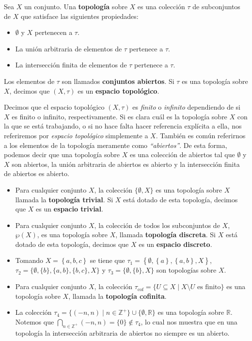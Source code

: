 \begin{Def}
   Sea $X$ un conjunto. Una \textbf{topología} sobre $X$ es una colección $\tau$ de subconjuntos de $X$ que satisface las siguientes propiedades:
   \begin{itemize}
      \item[1.] $\emptyset$ y $X$ pertenecen a $\tau$.
      \item[2.] La unión arbitraria de elementos de $\tau$ pertenece a $\tau$.
      \item[3.] La intersección finita de elementos de $\tau$ pertenece a $\tau$.
   \end{itemize}
   Los elementos de $\tau$ son llamados \textbf{conjuntos abiertos}. Si $\tau$ es una topología sobre $X$, decimos que $(X,\tau)$ es un \textbf{espacio topológico}.
\end{Def}
\begin{Obs}
   Decimos que el espacio topológico $(X,\tau)$ es \textit{finito} o \textit{infinito} dependiendo de si $X$ es finito o infinito, respectivamente. Si es clara cuál es la topología sobre $X$ con la que se está trabajando, o si no hace falta hacer referencia explícita a ella, nos referiremos por \textit{espacio topológico} simplemente a $X$. También es común referirnos a los elementos de la topología meramente como \textit{``abiertos''}. De esta forma, podemos decir que una topología sobre $X$ es una colección de abiertos tal que $\emptyset$ y $X$ son abiertos, la unión arbitraria de abiertos es abierto y la intersección finita de abiertos es abierto.
\end{Obs}
\begin{Ejm}\label{Ejm:Topologias}
   \phantom{o}\par
   \begin{itemize}
      \item Para cualquier conjunto $X$, la colección $\{\emptyset, X\}$ es una topología sobre $X$ llamada la \textbf{topología trivial}. Si $X$ está dotado de esta topología, decimos que $X$ es un \textbf{espacio trivial}.
      \item Para cualquier conjunto $X$, la colección de todos los subconjuntos de $X$, $\wp(X)$, es una topología sobre $X$, llamada \textbf{topología discreta}. Si $X$ está dotado de esta topología, decimos que $X$ es un \textbf{espacio discreto}.
      \item Tomando $X=\left\lbrace a,b,c\right\rbrace$ se tiene que $\tau_1=\left\lbrace \emptyset, \left\lbrace a\right\rbrace, \left\lbrace a,b\right\rbrace, X\right\rbrace$, $\tau_2=\{\emptyset,\{b\},\{a,b\},\allowbreak\{b,c\},X\}$ y $\tau_3=\{\emptyset,\{b\},X\}$ son topologías sobre $X$.
      \item Para cualquier conjunto $X$, la colección $\tau_{\text{cof}}=\{U\subseteq X\mid X\setminus U \text{ es finito}\}$ es una topología sobre $X$, llamada la \textbf{topología cofinita}.
      \item La colección $\tau_4=\{(-n,n)\mid n\in \mathbb{Z}^+\}\cup\{\emptyset, \mathbb{R}\}$ es una topología sobre $\mathbb{R}$. Notemos que $\bigcap_{n\in \mathbb{Z}^+}(-n,n)=\{0\}\notin \tau_4$, lo cual nos muestra que en una topología la intersección arbitraria de abiertos no siempre es un abierto.
   \end{itemize}
\end{Ejm}
